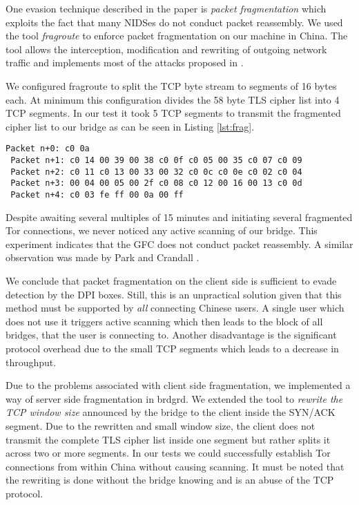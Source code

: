 \documentclass[runningheads,a4paper]{llncs}
\begin{document}
One evasion technique described in the paper is \emph{packet fragmentation} which exploits the fact
that many NIDSes do not conduct packet reassembly. We used the tool \emph{fragroute}
\cite{fragroute} to enforce packet fragmentation on our machine in China. The tool allows the
interception, modification and rewriting of outgoing network traffic and implements most of the
attacks proposed in \cite{Ptacek1998}.

We configured fragroute to split the TCP byte stream to segments of 16 bytes each. At minimum this
configuration divides the 58 byte TLS cipher list into 4 TCP segments. In our test it took 5 TCP
segments to transmit the fragmented cipher list to our bridge as can be seen in Listing
\ref{lst:frag}.

\begin{lstlisting}[basicstyle=\footnotesize\ttfamily,caption={Fragmentation of the cipher list.},
label={lst:frag},captionpos=b]
 Packet n+0: c0 0a
 Packet n+1: c0 14 00 39 00 38 c0 0f c0 05 00 35 c0 07 c0 09
 Packet n+2: c0 11 c0 13 00 33 00 32 c0 0c c0 0e c0 02 c0 04
 Packet n+3: 00 04 00 05 00 2f c0 08 c0 12 00 16 00 13 c0 0d
 Packet n+4: c0 03 fe ff 00 0a 00 ff
\end{lstlisting}

Despite awaiting several multiples of 15 minutes and initiating several fragmented Tor connections,
we never noticed any active scanning of our bridge. This experiment indicates that the GFC does not
conduct packet reassembly. A similar observation was made by Park and Crandall \cite{Park2010}.

We conclude that packet fragmentation on the client side is sufficient to evade detection by the DPI
boxes. Still, this is an unpractical solution given that this method must be supported by \emph{all}
connecting Chinese users. A single user which does not use it triggers active scanning which then
leads to the block of all bridges, that the user is connecting to. Another disadvantage is the
significant protocol overhead due to the small TCP segments which leads to a decrease in throughput.

Due to the problems associated with client side fragmentation, we implemented a way of server side
fragmentation in brdgrd. We extended the tool to \emph{rewrite the TCP window size} announced by the
bridge to the client inside the SYN/ACK segment. Due to the rewritten and small window size, the
client does not transmit the complete TLS cipher list inside one segment but rather splits it across
two or more segments. In our tests we could successfully establish Tor connections from within China
without causing scanning. It must be noted that the rewriting is done without the bridge knowing and
is an abuse of the TCP protocol.
\end{document}
